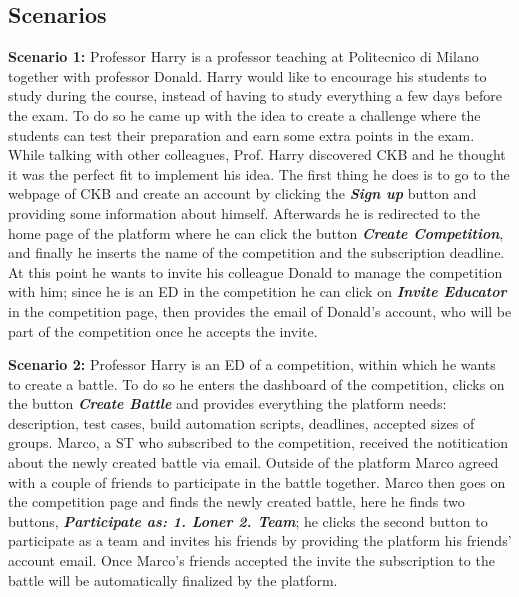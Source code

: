 \subsection{Scenarios}
\label{ss:scenarios}%
\textbf{Scenario 1:} Professor Harry is a professor teaching at Politecnico di Milano together with professor Donald. Harry would like to encourage his students to study during the course, instead of having to study everything a few days before the exam. To do so he came up with the idea to create a challenge where the students can test their preparation and earn some extra points in the exam. While talking with other colleagues, Prof. Harry discovered CKB and he thought it was the perfect fit to implement his idea. The first thing he does is to go to the webpage of CKB and create an account by clicking the \textbf{\textit{Sign up}} button and providing some information about himself. Afterwards he is redirected to the home page of the platform where he can click the button \textbf{\textit{Create Competition}}, and finally he inserts the name of the competition and the subscription deadline. At this point he wants to invite his colleague Donald to manage the competition with him; since he is an ED in the competition he can click on \textbf{\textit{Invite Educator}} in the competition page, then provides the email of Donald's account, who will be part of the competition once he accepts the invite.


\textbf{Scenario 2:} Professor Harry is an ED of a competition, within which he wants to create a battle. To do so he enters the dashboard of the competition, clicks on the button \textbf{\textit{Create Battle}} and provides everything the platform needs: description, test cases, build automation scripts, deadlines, accepted sizes of groups. Marco, a ST who subscribed to the competition, received the notitication about the newly created battle via email. Outside of the platform Marco agreed with a couple of friends to participate in the battle together. Marco then goes on the competition page and finds the newly created battle, here he finds two buttons, \textbf{\textit{Participate as: 1. Loner 2. Team}}; he clicks the second button to participate as a team and invites his friends by providing the platform his friends' account email. Once Marco's friends accepted the invite the subscription to the battle will be automatically finalized by the platform.


